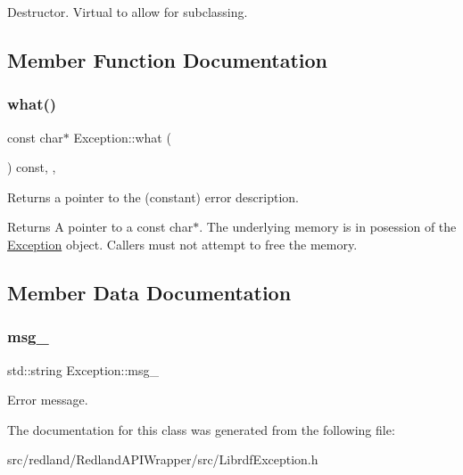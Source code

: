 Destructor. Virtual to allow for subclassing. 

\subsection{Member Function Documentation}
\mbox{\label{classException_ae7ba8334eb35e001b4b0c6df9339c0dc}} 
\subsubsection{\texorpdfstring{what()}{what()}}
{\footnotesize\ttfamily const char$\ast$ Exception\+::what (\begin{DoxyParamCaption}{ }\end{DoxyParamCaption}) const\hspace{0.3cm}{\ttfamily [inline]}, {\ttfamily [override]}, {\ttfamily [noexcept]}}

Returns a pointer to the (constant) error description. \begin{DoxyReturn}{Returns}
A pointer to a const char$\ast$. The underlying memory is in posession of the \hyperlink{classException}{Exception} object. Callers must not attempt to free the memory. 
\end{DoxyReturn}


\subsection{Member Data Documentation}
\mbox{\label{classException_a5d59cc46086c61391ed26773ce861780}} 
\subsubsection{\texorpdfstring{msg\+\_\+}{msg\_}}
{\footnotesize\ttfamily std\+::string Exception\+::msg\+\_\+\hspace{0.3cm}{\ttfamily [protected]}}

Error message. 

The documentation for this class was generated from the following file\+:\begin{DoxyCompactItemize}
\item 
src/redland/\+Redland\+A\+P\+I\+Wrapper/src/Librdf\+Exception.\+h\end{DoxyCompactItemize}
